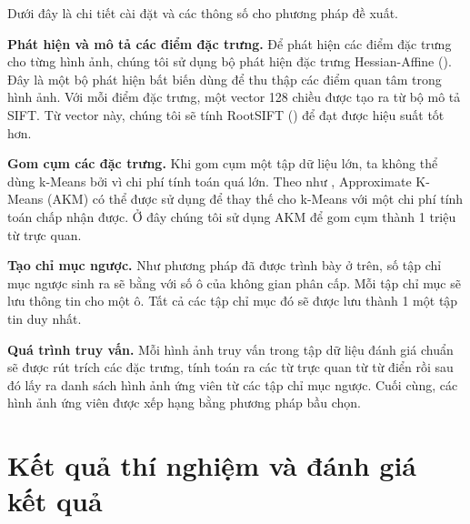 Dưới đây là chi tiết cài đặt và các thông số cho phương pháp đề xuất.

\textbf{Phát hiện và mô tả các điểm đặc trưng.} Để phát hiện các điểm đặc trưng cho từng hình ảnh, chúng tôi sử dụng bộ phát hiện đặc trưng Hessian-Affine (\cite{mikolajczyk2005comparison}). Đây là một bộ phát hiện bất biến dùng để thu thập các điểm quan tâm trong hình ảnh. Với mỗi điểm đặc trưng, một vector 128 chiều được tạo ra từ bộ mô tả SIFT. Từ vector này, chúng tôi sẽ tính RootSIFT (\cite{arandjelovic2012three}) để đạt được hiệu suất tốt hơn.

\textbf{Gom cụm các đặc trưng.} Khi gom cụm một tập dữ liệu lớn, ta không thể dùng k-Means bởi vì chi phí tính toán quá lớn. Theo như \cite{philbin2007object}, Approximate K-Means (AKM) có thể được sử dụng để thay thế cho k-Means với một chi phí tính toán chấp nhận được. Ở đây chúng tôi sử dụng AKM để gom cụm thành 1 triệu từ trực quan.

\textbf{Tạo chỉ mục ngược.} Như phương pháp đã được trình bày ở trên, số tập chỉ mục ngược sinh ra sẽ bằng với số ô của không gian phân cấp. Mỗi tập chỉ mục sẽ lưu thông tin cho một ô. Tất cả các tập chỉ mục đó sẽ được lưu thành 1 một tập tin duy nhất.

\textbf{Quá trình truy vấn.} Mỗi hình ảnh truy vấn trong tập dữ liệu đánh giá chuẩn sẽ được rút trích các đặc trưng, tính toán ra các từ trực quan từ từ điển rồi sau đó lấy ra danh sách hình ảnh ứng viên từ các tập chỉ mục ngược. Cuối cùng, các hình ảnh ứng viên được xếp hạng bằng phương pháp bầu chọn.

\section{Kết quả thí nghiệm và đánh giá kết quả}
\label{experimental-result}

